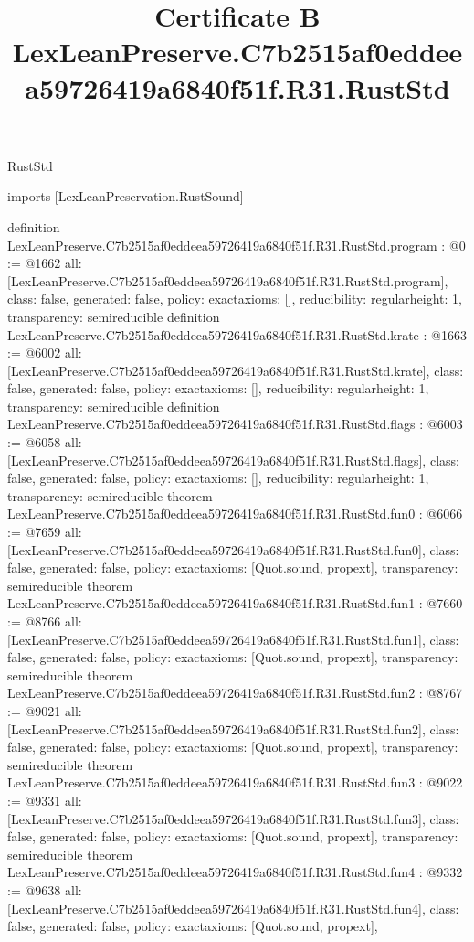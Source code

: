 \begin{lexlean}{RustStd}
\title{Certificate B LexLeanPreserve.C7b2515af0eddeea59726419a6840f51f.R31.RustStd}
\begin{coremodule}
imports [LexLeanPreservation.RustSound]

definition LexLeanPreserve.C7b2515af0eddeea59726419a6840f51f.R31.RustStd.program : @0 := @1662 {
  all: [LexLeanPreserve.C7b2515af0eddeea59726419a6840f51f.R31.RustStd.program],
  class: false,
  generated: false,
  policy: exact{axioms: []},
  reducibility: regular{height: 1},
  transparency: semireducible
}
definition LexLeanPreserve.C7b2515af0eddeea59726419a6840f51f.R31.RustStd.krate : @1663 := @6002 {
  all: [LexLeanPreserve.C7b2515af0eddeea59726419a6840f51f.R31.RustStd.krate],
  class: false,
  generated: false,
  policy: exact{axioms: []},
  reducibility: regular{height: 1},
  transparency: semireducible
}
definition LexLeanPreserve.C7b2515af0eddeea59726419a6840f51f.R31.RustStd.flags : @6003 := @6058 {
  all: [LexLeanPreserve.C7b2515af0eddeea59726419a6840f51f.R31.RustStd.flags],
  class: false,
  generated: false,
  policy: exact{axioms: []},
  reducibility: regular{height: 1},
  transparency: semireducible
}
theorem LexLeanPreserve.C7b2515af0eddeea59726419a6840f51f.R31.RustStd.fun0 : @6066 := @7659 {
  all: [LexLeanPreserve.C7b2515af0eddeea59726419a6840f51f.R31.RustStd.fun0],
  class: false,
  generated: false,
  policy: exact{axioms: [Quot.sound, propext]},
  transparency: semireducible
}
theorem LexLeanPreserve.C7b2515af0eddeea59726419a6840f51f.R31.RustStd.fun1 : @7660 := @8766 {
  all: [LexLeanPreserve.C7b2515af0eddeea59726419a6840f51f.R31.RustStd.fun1],
  class: false,
  generated: false,
  policy: exact{axioms: [Quot.sound, propext]},
  transparency: semireducible
}
theorem LexLeanPreserve.C7b2515af0eddeea59726419a6840f51f.R31.RustStd.fun2 : @8767 := @9021 {
  all: [LexLeanPreserve.C7b2515af0eddeea59726419a6840f51f.R31.RustStd.fun2],
  class: false,
  generated: false,
  policy: exact{axioms: [Quot.sound, propext]},
  transparency: semireducible
}
theorem LexLeanPreserve.C7b2515af0eddeea59726419a6840f51f.R31.RustStd.fun3 : @9022 := @9331 {
  all: [LexLeanPreserve.C7b2515af0eddeea59726419a6840f51f.R31.RustStd.fun3],
  class: false,
  generated: false,
  policy: exact{axioms: [Quot.sound, propext]},
  transparency: semireducible
}
theorem LexLeanPreserve.C7b2515af0eddeea59726419a6840f51f.R31.RustStd.fun4 : @9332 := @9638 {
  all: [LexLeanPreserve.C7b2515af0eddeea59726419a6840f51f.R31.RustStd.fun4],
  class: false,
  generated: false,
  policy: exact{axioms: [Quot.sound, propext]},
}
\end{coremodule}
\end{lexlean}
